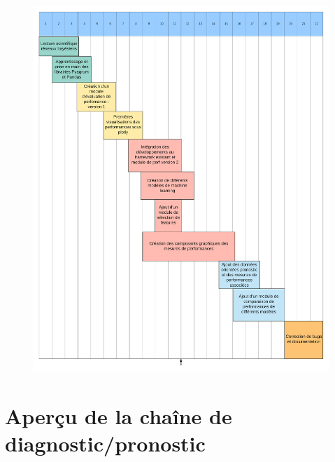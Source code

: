 \begin{figure}
  \centering
  \includegraphics[scale=0.3]{figures/Rapport_GANTT.png}
  \label{fig1}
\end{figure}

\clearpage

\section{Aperçu de la chaîne de diagnostic/pronostic}


